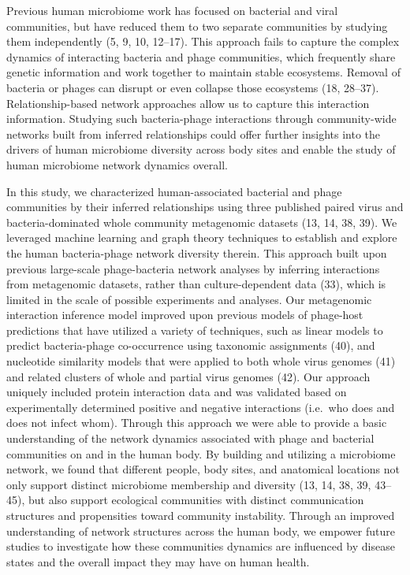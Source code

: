 \documentclass[12pt,]{article}
\begin{document}
Previous human microbiome work has focused on bacterial and viral
communities, but have reduced them to two separate communities by
studying them independently (5, 9, 10, 12--17). This approach fails to
capture the complex dynamics of interacting bacteria and phage
communities, which frequently share genetic information and work
together to maintain stable ecosystems. Removal of bacteria or phages
can disrupt or even collapse those ecosystems (18, 28--37).
Relationship-based network approaches allow us to capture this
interaction information. Studying such bacteria-phage interactions
through community-wide networks built from inferred relationships could
offer further insights into the drivers of human microbiome diversity
across body sites and enable the study of human microbiome network
dynamics overall.

In this study, we characterized human-associated bacterial and phage
communities by their inferred relationships using three published paired
virus and bacteria-dominated whole community metagenomic datasets (13,
14, 38, 39). We leveraged machine learning and graph theory techniques
to establish and explore the human bacteria-phage network diversity
therein. This approach built upon previous large-scale phage-bacteria
network analyses by inferring interactions from metagenomic datasets,
rather than culture-dependent data (33), which is limited in the scale
of possible experiments and analyses. Our metagenomic interaction
inference model improved upon previous models of phage-host predictions
that have utilized a variety of techniques, such as linear models to
predict bacteria-phage co-occurrence using taxonomic assignments (40),
and nucleotide similarity models that were applied to both whole virus
genomes (41) and related clusters of whole and partial virus genomes
(42). Our approach uniquely included protein interaction data and was
validated based on experimentally determined positive and negative
interactions (i.e.~who does and does not infect whom). Through this
approach we were able to provide a basic understanding of the network
dynamics associated with phage and bacterial communities on and in the
human body. By building and utilizing a microbiome network, we found
that different people, body sites, and anatomical locations not only
support distinct microbiome membership and diversity (13, 14, 38, 39,
43--45), but also support ecological communities with distinct
communication structures and propensities toward community instability.
Through an improved understanding of network structures across the human
body, we empower future studies to investigate how these communities
dynamics are influenced by disease states and the overall impact they
may have on human health.
\end{document}
